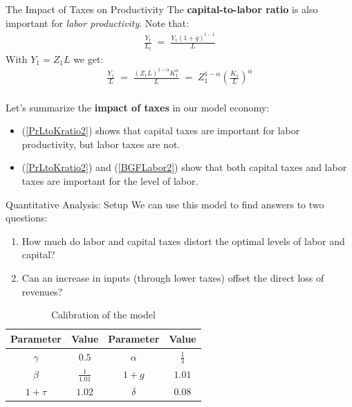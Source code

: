 \documentclass[10pt,c,aspectratio=1610,handout]{beamer}
\begin{document}
\begin{frame}{The Impact of Taxes on Productivity}%
  The \textbf{capital-to-labor ratio} is also important for \emph{labor productivity}. Note that:%
  \begin{align*}%
    \frac{Y_t}{L_t} \; = \; \frac{Y_1 (1+g)^{t-1}}{L}%
  \end{align*}%
  With $Y_1 = Z_1 L$ we get:%
  \begin{align}%
    \frac{Y_1}{L} \; = \; \frac{(Z_1 L)^{1-\alpha} K_1^{\alpha}}{L} \; = \; Z_1^{1-\alpha} \left( \frac{K_1}{L} \right)^{\alpha} \label{BGYL2}%
  \end{align}\\%
  \vspace*{0.2in}%
  \pause%
  Let's summarize the \textbf{impact of taxes} in our model economy:%
  \begin{small}%
    \begin{itemize}%
      \item[$\blacktriangleright$] (\ref{PrLtoKratio2}) shows that capital taxes are important for labor productivity, but labor taxes are not.%
      \item[$\blacktriangleright$] (\ref{PrLtoKratio2}) and (\ref{BGFLabor2}) show that both capital taxes and labor taxes are important for the level of labor.%
    \end{itemize}%
  \end{small}%
\end{frame}%
\begin{frame}{Quantitative Analysis: Setup}%
  We can use this model to find answers to two questions:%
  \begin{enumerate}%
    \item How much do labor and capital taxes distort the optimal levels of labor and capital?%
    \item Can an increase in inputs (through lower taxes) offset the direct loss of revenues?%
  \end{enumerate}%
  \vspace*{0.25in}%
  \pause%
  \begin{table}%
    \centering%
    \caption{Calibration of the model}%
    \begin{tabular}{c c c c}%
      \hline%
      \textbf{Parameter} & \textbf{Value} & \textbf{Parameter} & \textbf{Value}\\%
      \hline \hline%
      $\gamma$ & $0.5$ & $\alpha$ & $\frac{1}{3}$\\%
      $\beta$ & $\frac{1}{1.01}$ & $1+g$ & $1.01$\\%
      $1+\tau$ & $1.02$ & $\delta$ & $0.08$\\%
      \hline%
    \end{tabular}%
  \end{table}%
\end{frame}%
\end{document}
